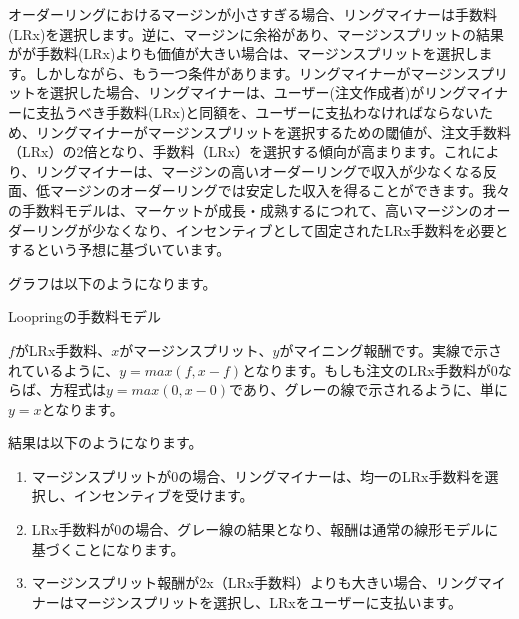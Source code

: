 \documentclass{article}
\makeatletter
\newenvironment{figurehere}
 {\def\@captype{figure}}
 {}
\makeatother
\begin{document}
\begin{multicols}{2}
オーダーリングにおけるマージンが小さすぎる場合、リングマイナーは手数料(LRx)を選択します。逆に、マージンに余裕があり、マージンスプリットの結果がが手数料(LRx)よりも価値が大きい場合は、マージンスプリットを選択します。しかしながら、もう一つ条件があります。リングマイナーがマージンスプリットを選択した場合、リングマイナーは、ユーザー(注文作成者)がリングマイナーに支払うべき手数料(LRx)と同額を、ユーザーに支払わなければならないため、リングマイナーがマージンスプリットを選択するための閾値が、注文手数料（LRx）の2倍となり、手数料（LRx）を選択する傾向が高まります。これにより、リングマイナーは、マージンの高いオーダーリングで収入が少なくなる反面、低マージンのオーダーリングでは安定した収入を得ることができます。我々の手数料モデルは、マーケットが成長・成熟するにつれて、高いマージンのオーダーリングが少なくなり、インセンティブとして固定されたLRx手数料を必要とするという予想に基づいています。


グラフは以下のようになります。

\begin{center}
\begin{figurehere}
\centering
{}
\caption{Loopringの手数料モデル}
\label{fig:feemodel}
\end{figurehere}
\end{center}


$f$がLRx手数料、$x$がマージンスプリット、$y$がマイニング報酬です。実線で示されているように、$y=max(f, x-f)$となります。もしも注文のLRx手数料が$0$ならば、方程式は$y=max(0, x - 0)$であり、グレーの線で示されるように、単に$y=x$となります。


結果は以下のようになります。  
\begin{enumerate}
	\item マージンスプリットが0の場合、リングマイナーは、均一のLRx手数料を選択し、インセンティブを受けます。 
	\item LRx手数料が0の場合、グレー線の結果となり、報酬は通常の線形モデルに基づくことになります。
	\item マージンスプリット報酬が2x（LRx手数料）よりも大きい場合、リングマイナーはマージンスプリットを選択し、LRxをユーザーに支払います。
\end{enumerate}


\end{multicols}
\end{document}

